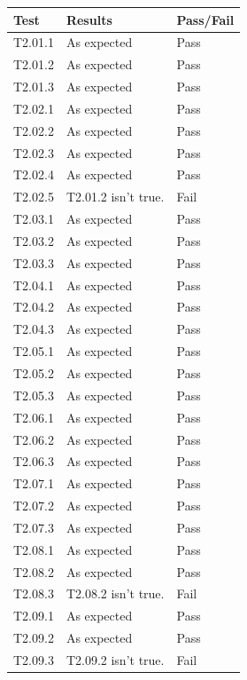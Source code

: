 \documentclass[]{article}
\begin{document}
\begin{table}[H]
\centering
\begin{tabular}{l|l|l}
\hline
Test & Results & Pass/Fail\\
\hline
T2.01.1 & As expected & Pass\\
\hline
T2.01.2 & As expected & Pass\\
\hline
T2.01.3 & As expected & Pass\\
\hline
T2.02.1 & As expected & Pass\\
\hline
T2.02.2 & As expected & Pass\\
\hline
T2.02.3 & As expected & Pass\\
\hline
T2.02.4 & As expected & Pass\\
\hline
T2.02.5 & T2.01.2 isn't true. & Fail\\
\hline
T2.03.1 & As expected & Pass\\
\hline
T2.03.2 & As expected & Pass\\
\hline
T2.03.3 & As expected & Pass\\
\hline
T2.04.1 & As expected & Pass\\
\hline
T2.04.2 & As expected & Pass\\
\hline
T2.04.3 & As expected & Pass\\
\hline
T2.05.1 & As expected & Pass\\
\hline
T2.05.2 & As expected & Pass\\
\hline
T2.05.3 & As expected & Pass\\
\hline
T2.06.1 & As expected & Pass\\
\hline
T2.06.2 & As expected & Pass\\
\hline
T2.06.3 & As expected & Pass\\
\hline
T2.07.1 & As expected & Pass\\
\hline
T2.07.2 & As expected & Pass\\
\hline
T2.07.3 & As expected & Pass\\
\hline
T2.08.1 & As expected & Pass\\
\hline
T2.08.2 & As expected & Pass\\
\hline
T2.08.3 & T2.08.2 isn't true. & Fail\\
\hline
T2.09.1 & As expected & Pass\\
\hline
T2.09.2 & As expected & Pass\\
\hline
T2.09.3 & T2.09.2 isn't true. & Fail\\
\hline
\end{tabular}
\end{table}
\end{document}
